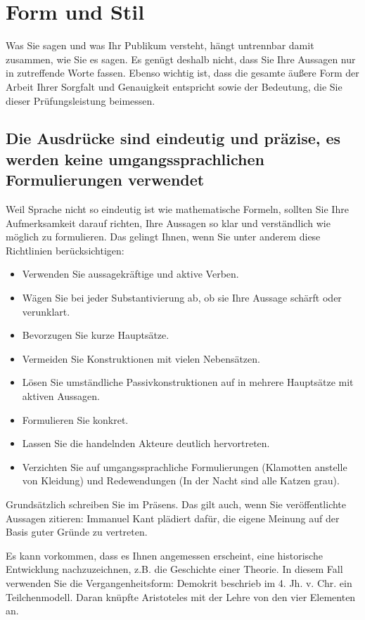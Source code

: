 \chapter{Form und Stil}
\label{chap:form-stil}

Was Sie sagen und was Ihr Publikum versteht, hängt untrennbar damit zusammen, wie Sie es sagen. Es genügt deshalb nicht, dass Sie Ihre Aussagen nur in zutreffende Worte fassen. Ebenso wichtig ist, dass die gesamte äußere Form der Arbeit Ihrer Sorgfalt und Genauigkeit entspricht sowie der Bedeutung, die Sie dieser Prüfungsleistung beimessen.

\section{Die Ausdrücke sind eindeutig und präzise, es werden keine umgangssprachlichen Formulierungen verwendet}
\label{sec:ausdruecke-praezise}

Weil Sprache nicht so eindeutig ist wie mathematische Formeln, sollten Sie Ihre Aufmerksamkeit darauf richten, Ihre Aussagen so klar und verständlich wie möglich zu formulieren. Das gelingt Ihnen, wenn Sie unter anderem diese Richtlinien berücksichtigen:
\begin{itemize}[label={--}]
\item Verwenden Sie aussagekräftige und aktive Verben.
\item Wägen Sie bei jeder Substantivierung ab, ob sie Ihre Aussage schärft oder verunklart.
\item Bevorzugen Sie kurze Hauptsätze.
\item Vermeiden Sie Konstruktionen mit vielen Nebensätzen.
\item Lösen Sie umständliche Passivkonstruktionen auf in mehrere Hauptsätze mit aktiven Aussagen.
\item Formulieren Sie konkret.
\item Lassen Sie die handelnden Akteure deutlich hervortreten.
\item Verzichten Sie auf umgangssprachliche Formulierungen (\glqq Klamotten\grqq{} anstelle von \glqq Kleidung\grqq{}) und Redewendungen (\glqq In der Nacht sind alle Katzen grau\grqq{}).
\end{itemize}

Grundsätzlich schreiben Sie im Präsens. Das gilt auch, wenn Sie veröffentlichte Aussagen zitieren: \glqq Immanuel Kant plädiert dafür, die eigene Meinung auf der Basis guter Gründe zu vertreten.\grqq{}

Es kann vorkommen, dass es Ihnen angemessen erscheint, eine historische Entwicklung nachzuzeichnen, z.B. die Geschichte einer Theorie. In diesem Fall verwenden Sie die Vergangenheitsform: \glqq Demokrit beschrieb im 4. Jh. v. Chr. ein Teilchenmodell. Daran knüpfte Aristoteles mit der Lehre von den vier Elementen an.\grqq{}

